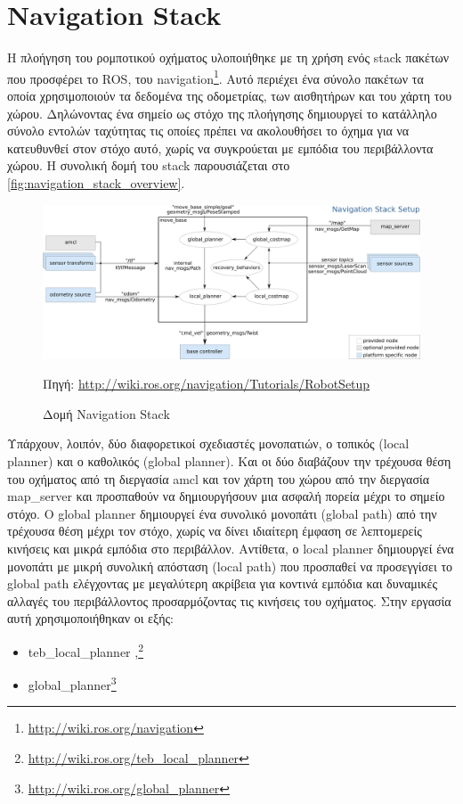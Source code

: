\section{Navigation Stack}
\label{section:navigation_stack}

Η πλοήγηση του ρομποτικού οχήματος υλοποιήθηκε με τη χρήση ενός stack πακέτων που προσφέρει το ROS, του navigation\footnote{\href{http://wiki.ros.org/navigation}{http://wiki.ros.org/navigation}}. Αυτό περιέχει ένα σύνολο πακέτων τα οποία χρησιμοποιούν τα δεδομένα της οδομετρίας, των αισθητήρων και του χάρτη του χώρου. Δηλώνοντας ένα σημείο ως στόχο της πλοήγησης δημιουργεί το κατάλληλο σύνολο εντολών ταχύτητας τις οποίες πρέπει να ακολουθήσει το όχημα για να κατευθυνθεί στον στόχο αυτό, χωρίς να συγκρούεται με εμπόδια του περιβάλλοντα χώρου. Η συνολική δομή του stack παρουσιάζεται στο \autoref{fig:navigation_stack_overview}.

\begin{figure}
    \centering
    \includegraphics[width=\textwidth]{./images/chapter4/overview_nav_stack.png}
    \caption{Δομή Navigation Stack}
    Πηγή: \href{http://wiki.ros.org/navigation/Tutorials/RobotSetup}{http://wiki.ros.org/navigation/Tutorials/RobotSetup}
    \label{fig:navigation_stack_overview}
\end{figure}

Υπάρχουν, λοιπόν, δύο διαφορετικοί σχεδιαστές μονοπατιών, ο τοπικός (local planner) και ο καθολικός (global planner). Και οι δύο διαβάζουν την τρέχουσα θέση του οχήματος από τη διεργασία amcl και τον χάρτη του χώρου από την διεργασία map\_server και προσπαθούν να δημιουργήσουν μια ασφαλή πορεία μέχρι το σημείο στόχο. Ο global planner δημιουργεί ένα συνολικό μονοπάτι (global path) από την τρέχουσα θέση μέχρι τον στόχο, χωρίς να δίνει ιδιαίτερη έμφαση σε λεπτομερείς κινήσεις και μικρά εμπόδια στο περιβάλλον. Αντίθετα, ο local planner δημιουργεί ένα μονοπάτι με μικρή συνολική απόσταση (local path) που προσπαθεί να προσεγγίσει το global path ελέγχοντας με μεγαλύτερη ακρίβεια για κοντινά εμπόδια και δυναμικές αλλαγές του περιβάλλοντος προσαρμόζοντας τις κινήσεις του οχήματος. Στην εργασία αυτή χρησιμοποιήθηκαν οι εξής:
\begin{itemize}
    \setlength\itemsep{-0.2em}
    \item teb\_local\_planner ,\footnote{\href{http://wiki.ros.org/teb_local_planner}{http://wiki.ros.org/teb_local_planner}}
    \item global\_planner\footnote{\href{http://wiki.ros.org/global_planner}{http://wiki.ros.org/global_planner}}
\end{itemize}

